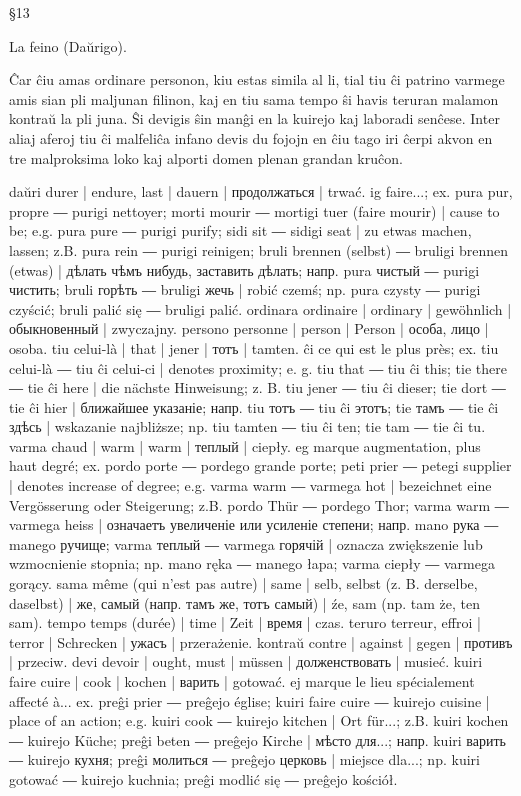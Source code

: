 §13

La feino (Daŭrigo).

Ĉar ĉiu amas ordinare personon, kiu estas simila al li, tial tiu ĉi patrino varmege amis sian pli maljunan filinon, kaj en tiu sama tempo ŝi havis teruran malamon kontraŭ la pli juna. Ŝi devigis ŝin manĝi en la kuirejo kaj laboradi senĉese. Inter aliaj aferoj tiu ĉi malfeliĉa infano devis du fojojn en ĉiu tago iri ĉerpi akvon en tre malproksima loko kaj alporti domen plenan grandan kruĉon.

daŭri durer | endure, last | dauern | продолжаться | trwać.
ig faire...; ex. pura pur, propre ― purigi nettoyer; morti mourir ― mortigi tuer (faire mourir) | cause to be; e.g. pura pure ― purigi purify; sidi sit ― sidigi seat | zu etwas machen, lassen; z.B. pura rein ― purigi reinigen; bruli brennen (selbst) ― bruligi brennen (etwas) | дѣлать чѣмъ нибудь, заставить дѣлать; напр. pura чистый ― purigi чистить; bruli горѣть ― bruligi жечь | robić czemś; np. pura czysty ― purigi czyścić; bruli palić się ― bruligi palić.
ordinara ordinaire | ordinary | gewöhnlich | обыкновенный | zwyczajny.
persono personne | person | Person | особа, лицо | osoba.
tiu celui-là | that | jener | тотъ | tamten.
ĉi ce qui est le plus près; ex. tiu celui-là ― tiu ĉi celui-ci | denotes proximity; e. g. tiu that ― tiu ĉi this; tie there ― tie ĉi here | die nächste Hinweisung; z. B. tiu jener ― tiu ĉi dieser; tie dort ― tie ĉi hier | ближайшее указаніе; напр. tiu тотъ ― tiu ĉi этотъ; tie тамъ ― tie ĉi здѣсь | wskazanie najbliższe; np. tiu tamten ― tiu ĉi ten; tie tam ― tie ĉi tu.
varma chaud | warm | warm | теплый | ciepły.
eg marque augmentation, plus haut degré; ex. pordo porte ― pordego grande porte; peti prier ― petegi supplier | denotes increase of degree; e.g. varma warm ― varmega hot | bezeichnet eine Vergösserung oder Steigerung; z.B. pordo Thür ― pordego Thor; varma warm ― varmega heiss | означаетъ увеличеніе или усиленіе степени; напр. mano рука ― manego ручище; varma теплый ― varmega горячій | oznacza zwiększenie lub wzmocnienie stopnia; np. mano ręka ― manego łapa; varma ciepły ― varmega gorący.
sama même (qui n’est pas autre) | same | selb, selbst (z. B. derselbe, daselbst) | же, самый (напр. тамъ же, тотъ самый) | źe, sam (np. tam że, ten sam).
tempo temps (durée) | time | Zeit | время | czas.
teruro terreur, effroi | terror | Schrecken | ужасъ | przerażenie.
kontraŭ contre | against | gegen | противъ | przeciw.
devi devoir | ought, must | müssen | долженствовать | musieć.
kuiri faire cuire | cook | kochen | варить | gotować.
ej marque le lieu spécialement affecté à... ex. preĝi prier ― preĝejo église; kuiri faire cuire ― kuirejo cuisine | place of an action; e.g. kuiri cook ― kuirejo kitchen | Ort für...; z.B. kuiri kochen ― kuirejo Küche; preĝi beten ― preĝejo Kirche | мѣсто для...; напр. kuiri варить ― kuirejo кухня; preĝi молиться ― preĝejo церковь | miejsce dla...; np. kuiri gotować ― kuirejo kuchnia; preĝi modlić się ― preĝejo kościół.
